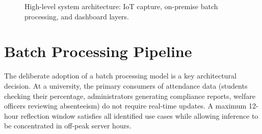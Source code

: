 \documentclass[12pt,a4paper]{report}
\begin{document}
\begin{figure}[H]
\caption{High-level system architecture: IoT capture, on-premise batch processing, and dashboard layers.}
\label{fig:arch_overview}
\end{figure}

\section{Batch Processing Pipeline}

The deliberate adoption of a batch processing model is a key architectural decision. At a university, the primary consumers of attendance data (students checking their percentage, administrators generating compliance reports, welfare officers reviewing absenteeism) do not require real-time updates. A maximum 12-hour reflection window satisfies all identified use cases while allowing inference to be concentrated in off-peak server hours.
\end{document}
